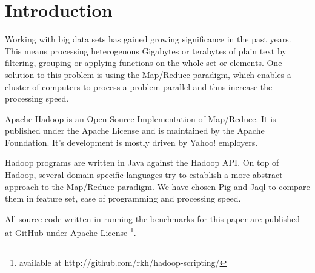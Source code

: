 \section{Introduction}

Working with big data sets has gained growing significance in the past years. This means processing heterogenous Gigabytes or terabytes of plain text by filtering, grouping or applying functions on the whole set or elements. One solution to this problem is using the Map/Reduce paradigm, which enables a cluster of computers to process a problem parallel and thus increase the processing speed.

Apache Hadoop is an Open Source Implementation of Map/Reduce. It is published under the Apache License and is maintained by the Apache Foundation. It's development is mostly driven by Yahoo! employers.

Hadoop programs are written in Java against the Hadoop API. On top of Hadoop, several domain specific languages try to establish a more abstract approach to the Map/Reduce paradigm. We have chosen Pig and Jaql to compare them in feature set, ease of programming and processing speed.

All source code written in running the benchmarks for this paper are published at GitHub under Apache License \footnote{available at http://github.com/rkh/hadoop-scripting/}.